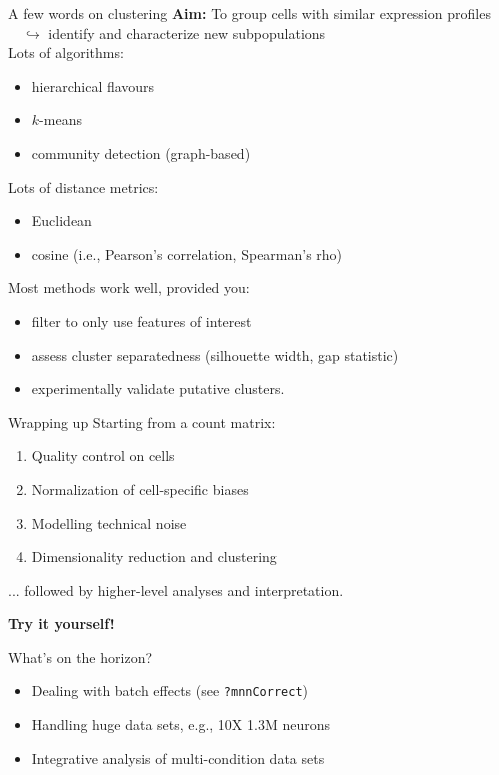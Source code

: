 \documentclass{beamer}
\begin{document}
\begin{frame}{A few words on clustering}
    \textbf{Aim:} To group cells with similar expression profiles \\
    $\quad\hookrightarrow$ identify and characterize new subpopulations\\[0.15in]

   Lots of algorithms:
\begin{itemize}
    \item hierarchical flavours
    \item $k$-means
    \item community detection (graph-based)
\end{itemize}
\vspace{0.1in}
Lots of distance metrics:
\begin{itemize}
    \item Euclidean
    \item cosine (i.e., Pearson's correlation, Spearman's rho)
\end{itemize}
\vspace{0.1in}
Most methods work well, provided you:
\begin{itemize}
    \item filter to only use features of interest
    \item assess cluster separatedness (silhouette width, gap statistic)
    \item experimentally validate putative clusters.
\end{itemize}
\end{frame}

\begin{frame}{Wrapping up}
    Starting from a count matrix:\\[0.1em]
    \begin{enumerate}
        \setlength\itemsep{0.5em}
        \item Quality control on cells 
        \item Normalization of cell-specific biases
        \item Modelling technical noise
        \item Dimensionality reduction and clustering
    \end{enumerate}
    ... followed by higher-level analyses and interpretation. \\[0.2in]
    \begin{center}
    \textbf{Try it yourself!}
\end{center}
\begin{block}{What's on the horizon?}
    \begin{itemize}
        \item Dealing with batch effects (see \texttt{?mnnCorrect})
        \item Handling huge data sets, e.g., 10X 1.3M neurons
        \item Integrative analysis of multi-condition data sets
    \end{itemize}
           
\end{block}
\end{frame}
\end{document}
